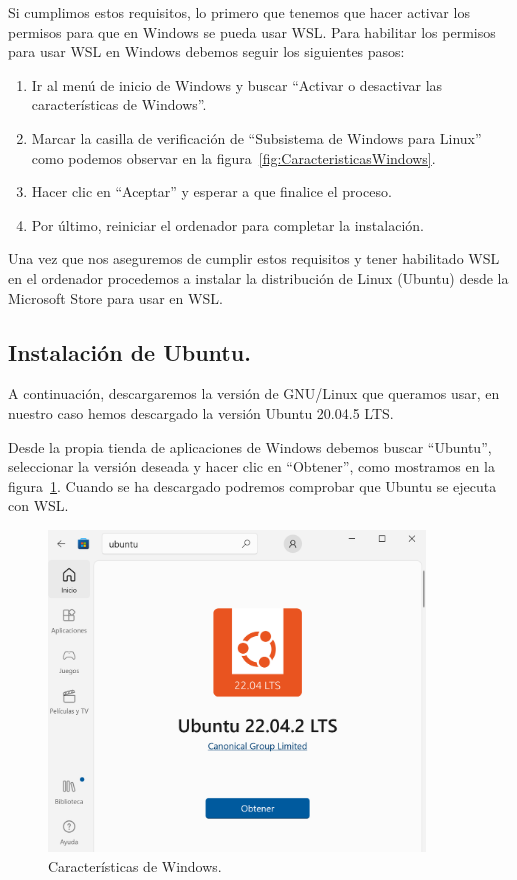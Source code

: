\documentclass[a4paper, 12pt]{book}
\begin{document}
Si cumplimos estos requisitos, lo primero que tenemos que hacer activar los permisos para que en Windows se pueda usar WSL.
Para habilitar los permisos para usar WSL en Windows debemos seguir los siguientes pasos:
\begin{enumerate}
  \item Ir al menú de inicio de Windows y buscar ``Activar o desactivar las características de Windows''.
  \item Marcar la casilla de verificación de ``Subsistema de Windows para Linux'' como podemos observar en la figura~\ref{fig:CaracteristicasWindows}.
  \item Hacer clic en ``Aceptar'' y esperar a que finalice el proceso. 
  \item Por último, reiniciar el ordenador para completar la instalación.
\end{enumerate} 
  

Una vez que nos aseguremos de cumplir estos requisitos y tener habilitado WSL en el ordenador procedemos a instalar la distribución de Linux (Ubuntu) desde la Microsoft Store para usar en WSL. 

\subsection{Instalación de Ubuntu.} %
\label{sec:instalación de ubuntu}

A continuación, descargaremos la versión de GNU/Linux que queramos usar, en nuestro caso hemos descargado la versión Ubuntu 20.04.5 LTS.


Desde la propia tienda de aplicaciones de Windows debemos buscar ``Ubuntu'', seleccionar la versión deseada y hacer clic en ``Obtener'', como mostramos en la figura~\ref{fig:ubuntu}.
Cuando se ha descargado podremos comprobar que Ubuntu se ejecuta con WSL.

\begin{figure}
  \centering
  \includegraphics[width=10cm, keepaspectratio]{img/Ubuntu.PNG}
  \caption{Características de Windows.}\label{fig:ubuntu}
\end{figure}
\end{document}
